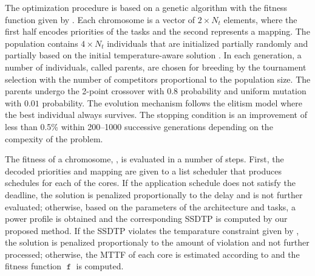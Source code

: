The optimization procedure is based on a genetic algorithm \cite{schmitz2004} with the fitness function given by . Each chromosome is a vector of $2 \times N_t$ elements, where the first half encodes priorities of the tasks and the second represents a mapping. The population contains $4 \times N_t$ individuals that are initialized partially randomly and partially based on the initial temperature-aware solution \cite{xie2006}. In each generation, a number of individuals, called parents, are chosen for breeding by the tournament selection with the number of competitors proportional to the population size. The parents undergo the 2-point crossover with $0.8$ probability and uniform mutation with $0.01$ probability. The evolution mechanism follows the elitism model where the best individual always survives. The stopping condition is an improvement of less than 0.5\% within 200--1000 successive generations depending on the compexity of the problem.

The fitness of a chromosome, , is evaluated in a number of steps. First, the decoded priorities and mapping are given to a list scheduler that produces schedules for each of the cores. If the application schedule does not satisfy the deadline, the solution is penalized proportionally to the delay and is not further evaluated; otherwise, based on the parameters of the architecture and tasks, a power profile is obtained and the corresponding SSDTP is computed by our proposed method. If the SSDTP violates the temparature constraint given by , the solution is penalized proportionaly to the amount of violation and not further processed; otherwise, the MTTF of each core is estimated according to  and the fitness function $\mttf$ is computed.
